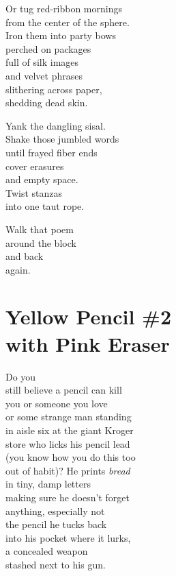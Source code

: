 \documentclass[twoside,10pt]{book}
\begin{document}
Or tug red-ribbon mornings\\
from the center of the sphere.\\
Iron them into party bows\\
perched on packages\\
full of silk images\\
and velvet phrases\\
slithering across paper,\\
shedding dead skin.

Yank the dangling sisal.\\
Shake those jumbled words\\
until frayed fiber ends\\
cover erasures\\
and empty space.\\
Twist stanzas\\
into one taut rope.

Walk that poem\\
around the block\\
and back\\
again.


\clearpage
\section{Yellow Pencil \#2\\
  with Pink Eraser}

Do you\\
still believe a pencil can kill\\
you or someone you love\\
or some strange man standing\\
in aisle six at the giant Kroger\\
store who licks his pencil lead\\
(you know how you do this too\\
out of habit)? He prints \emph{bread}\\
in tiny, damp letters\\
making sure he doesn't forget\\
anything, especially not\\
the pencil he tucks back\\
into his pocket where it lurks,\\
a concealed weapon\\
stashed next to his gun.
\end{document}
